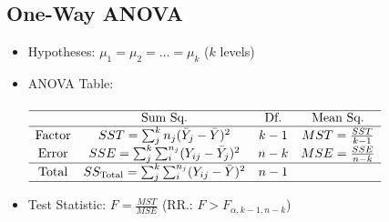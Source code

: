 \documentclass[%
 aip,
 jmp,%
 amsmath,amssymb,
 reprint,%
]{revtex4-1}
\begin{document}
\subsection{One-Way ANOVA}
\begin{itemize}[label={}]
\item Hypotheses: $\mu_1=\mu_2=\dots=\mu_k$ ($k$ levels)
\item ANOVA Table: \\\\
{\footnotesize
$\begin{array}{cccc}
\hline
& \textrm{Sum Sq.} & \textrm{Df.} & \textrm{Mean Sq.} \\
\hline
\textrm{Factor} & SST=\sum_{j}^{k} n_j(\bar{Y}_j-\bar{Y})^2 & k-1 & MST=\frac{SST}{k-1} \\
\textrm{Error} & SSE=\sum_{j}^{k}\sum_{i}^{n_j} (Y_{ij}-\bar{Y}_j)^2 & n-k & MSE=\frac{SSE}{n-k} \\
\hline
\textrm{Total} & SS_{\textrm{Total}}=\sum_{j}^{k}\sum_{i}^{n_j} (Y_{ij}-\bar{Y})^2 & n-1 \\
\hline
\end{array}$
}
\item Test Statistic: 
$F = \frac{MST}{MSE}$ {\small (RR.: $F > F_{\alpha, k-1, n-k}$)}
\end{itemize}
\end{document}

